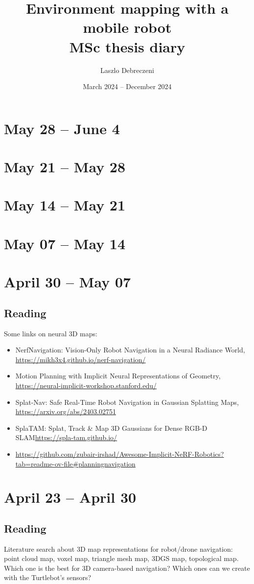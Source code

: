 \documentclass{article}
\title{Environment mapping with a mobile robot \\
\Large MSc thesis diary}
\author{Laszlo Debreczeni}
\date{March 2024 -- December 2024}
\begin{document}
\maketitle

\tableofcontents
\newpage

\section{May 28 -- June 4}
\section{May 21 -- May 28}
\section{May 14 -- May 21}
\section{May 07 -- May 14}
\section{April 30 -- May 07}
\subsection{Reading}
Some links on neural 3D maps:
\begin{itemize}
\item NerfNavigation: Vision-Only Robot Navigation in a Neural Radiance World, \url{https://mikh3x4.github.io/nerf-navigation/}
\item Motion Planning with Implicit Neural Representations of Geometry, \url{https://neural-implicit-workshop.stanford.edu/}
\item Splat-Nav: Safe Real-Time Robot Navigation in Gaussian Splatting Maps, \url{https://arxiv.org/abs/2403.02751}
\item SplaTAM: Splat, Track \& Map 3D Gaussians for Dense RGB-D SLAM\url{https://spla-tam.github.io/}
\item \url{https://github.com/zubair-irshad/Awesome-Implicit-NeRF-Robotics?tab=readme-ov-file#planningnavigation}
\end{itemize}


\section{April 23 -- April 30}

\subsection{Reading}
Literature search about 3D map representations for robot/drone navigation: point cloud map, voxel map, triangle mesh map, 3DGS map, topological map. Which one is the best for 3D camera-based navigation? Which ones can we create with the Turtlebot's sensors?
\end{document}
